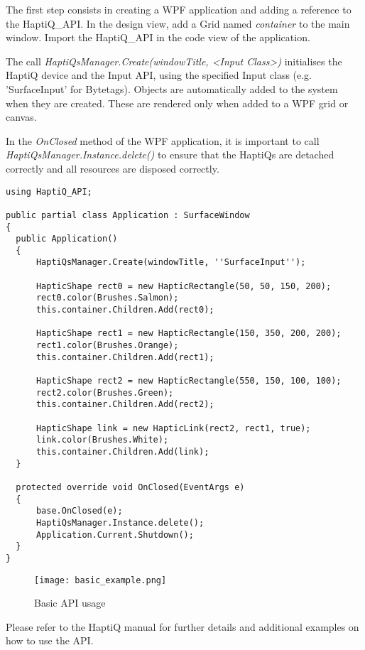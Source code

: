 The first step consists in creating a WPF application and adding a reference to the HaptiQ\_API. In the design view, add a Grid named \textit{container} to the main window. Import the HaptiQ\_API in the code view of the application. 

The call \textit{HaptiQsManager.Create(windowTitle, \textless Input Class\textgreater)} initialises the HaptiQ device and the Input API, using the specified Input class (e.g. 'SurfaceInput' for Bytetags). 
Objects are automatically added to the system when they are created. These are rendered only when added to a WPF grid or canvas. 

In the \textit{OnClosed} method of the WPF application, it is important to call \textit{HaptiQsManager.Instance.delete()} to ensure that the HaptiQs are detached correctly and all resources are disposed correctly.

\lstset{style=sharpc}
\begin{lstlisting}[caption={Basic API usage},label={lst:basicAPIUsage}]
using HaptiQ_API;

public partial class Application : SurfaceWindow
{
  public Application()
  {
      HaptiQsManager.Create(windowTitle, ''SurfaceInput'');
      
      HapticShape rect0 = new HapticRectangle(50, 50, 150, 200);
      rect0.color(Brushes.Salmon);
      this.container.Children.Add(rect0);
      
      HapticShape rect1 = new HapticRectangle(150, 350, 200, 200);
      rect1.color(Brushes.Orange);
      this.container.Children.Add(rect1);
      
      HapticShape rect2 = new HapticRectangle(550, 150, 100, 100);
      rect2.color(Brushes.Green);
      this.container.Children.Add(rect2);
      
      HapticShape link = new HapticLink(rect2, rect1, true);
      link.color(Brushes.White);
      this.container.Children.Add(link);
  }
  
  protected override void OnClosed(EventArgs e)
  {
      base.OnClosed(e);
      HaptiQsManager.Instance.delete();
      Application.Current.Shutdown();
  }
}
\end{lstlisting}

\begin{figure}[H]
  \centering
  \texttt{[image: basic\_example.png]}
  \caption{Basic API usage}
  \label{fig:basicexample}
\end{figure}

Please refer to the HaptiQ manual for further details and additional examples on how to use the API. 



